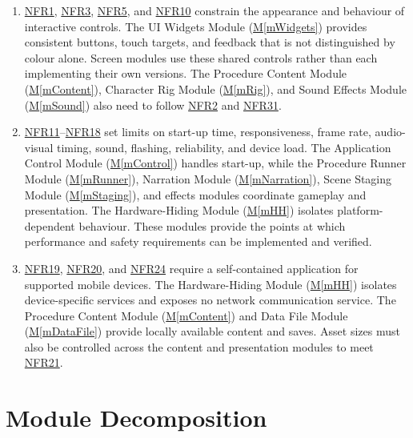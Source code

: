 \documentclass[10pt, titlepage]{article}
\newcommand{\srsurl}{https://team-hindsight.github.io/ophthamology-game/SRS/SRS.pdf}
\newcommand{\srsitemref}[2]{\href{\srsurl\#nameddest=#1}{#2}}
\newcommand{\mref}[1]{\texorpdfstring{\hyperref[md:#1]{M\ref*{#1}}}{M\ref*{#1}}}
\begin{document}
\begin{enumerate}[leftmargin=*, itemsep=0.5em, parsep=0.15em]
\item \srsitemref{NFR_Layout}{NFR1}, \srsitemref{NFR_TouchTarget}{NFR3},
  \srsitemref{NFR_Usability}{NFR5}, and \srsitemref{NFR_Colour}{NFR10}
  constrain the appearance and behaviour of interactive controls. The UI
  Widgets Module (\mref{mWidgets}) provides consistent buttons, touch targets,
  and feedback that is not distinguished by colour alone. Screen modules use
  these shared controls rather than each implementing their own versions.
  The Procedure Content Module (\mref{mContent}), Character Rig Module
  (\mref{mRig}), and Sound Effects Module (\mref{mSound}) also need to follow
  \srsitemref{NFR_ChildSafe}{NFR2} and
  \srsitemref{NFR_Inclusivity}{NFR31}.

\item \srsitemref{NFR_Startup}{NFR11}--\srsitemref{NFR_DeviceHeat}{NFR18}
  set limits on start-up time, responsiveness, frame rate, audio-visual timing,
  sound, flashing, reliability, and device load. The Application Control Module
  (\mref{mControl}) handles start-up, while the Procedure Runner Module
  (\mref{mRunner}), Narration Module (\mref{mNarration}), Scene Staging Module
  (\mref{mStaging}), and effects modules coordinate gameplay and presentation.
  The Hardware-Hiding Module (\mref{mHH}) isolates platform-dependent
  behaviour. These modules provide the points at which performance and safety
  requirements can be implemented and verified.

\item \srsitemref{NFR_Offline}{NFR19},
  \srsitemref{NFR_Installability}{NFR20}, and
  \srsitemref{NFR_Portability}{NFR24} require a self-contained application for
  supported mobile devices. The Hardware-Hiding Module (\mref{mHH}) isolates
  device-specific services and exposes no network communication service. The
  Procedure Content Module (\mref{mContent}) and Data File Module
  (\mref{mDataFile}) provide locally available content and saves. Asset sizes
  must also be controlled across the content and presentation modules to meet
  \srsitemref{NFR_InstallSize}{NFR21}.

\end{enumerate}

\newpage
\section{Module Decomposition} \label{SecMD}
\end{document}
